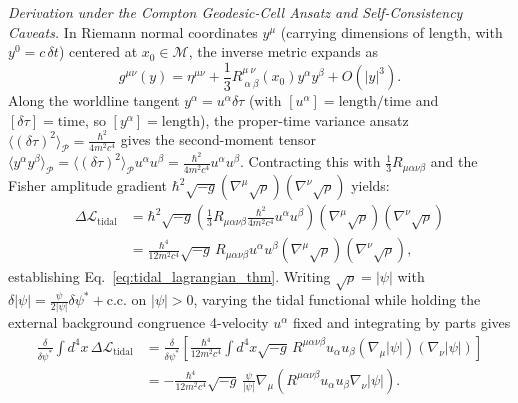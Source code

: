 \documentclass[11pt, a4paper]{article}
\theoremstyle{definition}
\newenvironment{conjecturederivation}[1][Derivation]{\par\medskip\noindent\textit{#1.}\;\ignorespaces}{\par\medskip}
\begin{document}
\begin{conjecturederivation}[Derivation under the Compton Geodesic-Cell Ansatz and Self-Consistency Caveats]
In Riemann normal coordinates $y^\mu$ (carrying dimensions of length, with $y^0 = c\,\delta t$) centered at $x_0 \in \mathcal{M}$, the inverse metric expands as
\begin{equation}
\label{eq:inverse_rnc}
g^{\mu\nu}(y) = \eta^{\mu\nu} + \frac{1}{3} R^{\mu\ \nu}_{\ \alpha\ \beta}(x_0) y^\alpha y^\beta + O(|y|^3).
\end{equation}
Along the worldline tangent $y^\alpha = u^\alpha \delta\tau$ (with $[u^\alpha] = \text{length}/\text{time}$ and $[\delta\tau] = \text{time}$, so $[y^\alpha] = \text{length}$), the proper-time variance ansatz $\langle (\delta\tau)^2 \rangle_{\mathcal{P}} = \frac{\hbar^2}{4m^2 c^4}$ gives the second-moment tensor $\langle y^\alpha y^\beta \rangle_{\mathcal{P}} = \langle (\delta\tau)^2 \rangle_{\mathcal{P}} u^\alpha u^\beta = \frac{\hbar^2}{4m^2 c^4} u^\alpha u^\beta$. Contracting this with $\frac{1}{3}R_{\mu\alpha\nu\beta}$ and the Fisher amplitude gradient $\hbar^2 \sqrt{-g}(\nabla^\mu \sqrt{\rho})(\nabla^\nu \sqrt{\rho})$ yields:
\begin{equation}
\begin{aligned}
\Delta \mathcal{L}_{\text{tidal}} &= \hbar^2 \sqrt{-g} \left( \frac{1}{3} R_{\mu\alpha\nu\beta} \frac{\hbar^2}{4m^2 c^4} u^\alpha u^\beta \right) (\nabla^\mu \sqrt{\rho})(\nabla^\nu \sqrt{\rho}) \\
&= \frac{\hbar^4}{12 m^2 c^4} \sqrt{-g} \, R_{\mu\alpha\nu\beta} u^\alpha u^\beta (\nabla^\mu \sqrt{\rho})(\nabla^\nu \sqrt{\rho}),
\end{aligned}
\end{equation}
establishing Eq.~\eqref{eq:tidal_lagrangian_thm}. Writing $\sqrt{\rho} = |\psi|$ with $\delta|\psi| = \frac{\psi}{2|\psi|}\delta\psi^* + \text{c.c.}$ on $|\psi| > 0$, varying the tidal functional while holding the external background congruence 4-velocity $u^\alpha$ fixed and integrating by parts gives
\[
\begin{aligned}
\frac{\delta}{\delta\psi^*}\int d^4x\,\Delta\mathcal{L}_{\text{tidal}} &= \frac{\delta}{\delta\psi^*}\left[ \frac{\hbar^4}{12m^2 c^4}\int d^4x\sqrt{-g}\,R^{\mu\alpha\nu\beta}u_\alpha u_\beta(\nabla_\mu|\psi|)(\nabla_\nu|\psi|) \right] \\
&= -\frac{\hbar^4}{12m^2 c^4}\sqrt{-g}\,\frac{\psi}{|\psi|}\nabla_\mu\left(R^{\mu\alpha\nu\beta}u_\alpha u_\beta\nabla_\nu|\psi|\right).
\end{aligned}
\]
\end{conjecturederivation}
\end{document}
